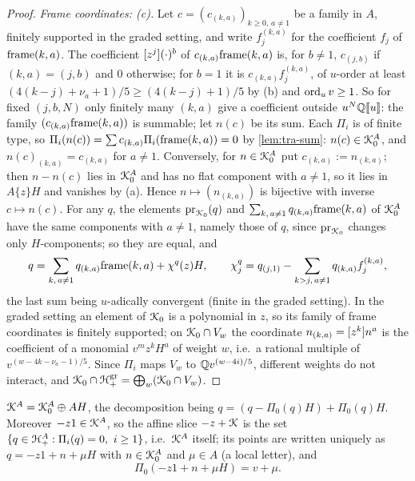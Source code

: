 \begin{proof}
\emph{Frame coordinates: (c).} Let $c = (c_{(k,a)})_{k\geq 0,\,a\neq 1}$ be a family in $A$, finitely supported in the graded setting, and write $f^{(k,a)}_j$ for the coefficient $f_j$ of $\mathrm{frame}(k,a)$. The coefficient $[z^j](\cdot)^b$ of $c_{(k,a)}\mathrm{frame}(k,a)$ is, for $b\neq 1$, $c_{(j,b)}$ if $(k,a) = (j,b)$ and $0$ otherwise; for $b = 1$ it is $c_{(k,a)}f^{(k,a)}_j$, of $u$-order at least $(4(k-j)+\nu_a+1)/5\geq(4(k-j)+1)/5$ by (b) and $\operatorname{ord}_uv\geq 1$. So for fixed $(j,b,N)$ only finitely many $(k,a)$ give a coefficient outside $u^N\mathbb{Q}[\![ u ]\!]$: the family $(c_{(k,a)}\mathrm{frame}(k,a))$ is summable; let $n(c)$ be its sum. Each $\Pi_i$ is of finite type, so $\Pi_i(n(c)) = \sum c_{(k,a)}\Pi_i(\mathrm{frame}(k,a)) = 0$ by \cref{lem:tra-sum}: $n(c)\in\mathcal{K}_{0}^A$, and $n(c)_{(k,a)} = c_{(k,a)}$ for $a\neq 1$. Conversely, for $n\in\mathcal{K}_{0}^A$ put $c_{(k,a)} := n_{(k,a)}$; then $n-n(c)$ lies in $\mathcal{K}_{0}^A$ and has no flat component with $a\neq 1$, so it lies in $A\{z\}H$ and vanishes by (a). Hence $n\mapsto(n_{(k,a)})$ is bijective with inverse $c\mapsto n(c)$. For any $q$, the elements $\mathrm{pr}_{\mathcal{K}_{0}}(q)$ and $\sum_{k,\,a\neq 1}q_{(k,a)}\mathrm{frame}(k,a)$ of $\mathcal{K}_{0}^A$ have the same components with $a\neq 1$, namely those of $q$, since $\mathrm{pr}_{\mathcal{K}_{0}}$ changes only $H$-components; so they are equal, and
\begin{equation}
\label{eq:tra-decomp}
q = \sum_{k,\,a\neq 1}q_{(k,a)}\mathrm{frame}(k,a)+\chi^q(z)H,\qquad \chi^q_j = q_{(j,1)}-\sum_{k>j,\,a\neq 1}q_{(k,a)}f^{(k,a)}_j,
\end{equation}
the last sum being $u$-adically convergent (finite in the graded setting). In the graded setting an element of $\mathcal{K}_{0}$ is a polynomial in $z$, so its family of frame coordinates is finitely supported; on $\mathcal{K}_{0}\cap V_w$ the coordinate $n_{(k,a)} = [z^k]n^a$ is the coefficient of a monomial $v^mz^kH^a$ of weight $w$, i.e.\ a rational multiple of $v^{(w-4k-\nu_a-1)/5}$. Since $\Pi_i$ maps $V_w$ to $\mathbb{Q} v^{(w-4i)/5}$, different weights do not interact, and $\mathcal{K}_{0}\cap\mathcal{H}^{\mathrm{gr}}_+ = \bigoplus_w(\mathcal{K}_{0}\cap V_w)$.
\end{proof}

\begin{cor}
\label{cor:tra-slice}
$\mathcal{K}^A = \mathcal{K}_{0}^A\oplus AH$, the decomposition being $q = (q-\Pi_0(q)H)+\Pi_0(q)H$. Moreover $-z1\in\mathcal{K}^A$, so the affine slice $-z+\mathcal{K}$ is the set $\{q\in\mathcal{H}^A_+ : \Pi_i(q) = 0,\ i\geq 1\}$, i.e.\ $\mathcal{K}^A$ itself; its points are written uniquely as $q = -z1+n+\mu H$ with $n\in\mathcal{K}_{0}^A$ and $\mu\in A$ (a local letter), and
\[
\Pi_0(-z1+n+\mu H) = v+\mu .
\]
\end{cor}

